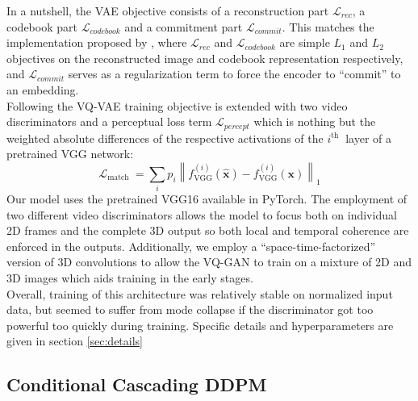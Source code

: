 \documentclass{article}
\begin{document}
In a nutshell, the VAE objective consists of a reconstruction part $\mathcal{L}_{rec}$, a codebook part $\mathcal{L}_{codebook}$ and a commitment part $\mathcal{L}_{commit}$. This matches the implementation proposed by \cite{oord2018neural}, where $\mathcal{L}_{rec}$ and $\mathcal{L}_{codebook}$ are simple $L_1$ and $L_2$ objectives on the reconstructed image and codebook representation respectively, and $\mathcal{L}_{commit}$ serves as a regularization term to force the encoder to ``commit'' to an embedding. \\
Following \cite{ge2022long} the VQ-VAE training objective is extended with two video discriminators and a perceptual loss term $\mathcal{L}_{percept}$ which is nothing but the weighted absolute differences of the respective activations of the $i^{\text {th }}$ layer of a pretrained VGG \cite{simonyan2015deep} network: 
\begin{equation}
\mathcal{L}_{\text {match }}=\sum_i p_i\left\|f_{\mathrm{VGG}}^{(i)}(\hat{\mathbf{x}})-f_{\mathrm{VGG}}^{(i)}(\mathbf{x})\right\|_1
\end{equation}
Our model uses the pretrained VGG16 available in PyTorch.
The employment of two different video discriminators allows the model to focus both on individual 2D frames and the complete 3D output so both local and temporal coherence are enforced in the outputs. Additionally, we employ a ``space-time-factorized'' version of 3D convolutions to allow the VQ-GAN to train on a mixture of 2D and 3D images which aids training in the early stages. \\
Overall, training of this architecture was relatively stable on normalized input data, but seemed to suffer from mode collapse if the discriminator got too powerful too quickly during training. Specific details and hyperparameters are given in section \ref{sec:details}

\subsection{Conditional Cascading DDPM}
\end{document}
